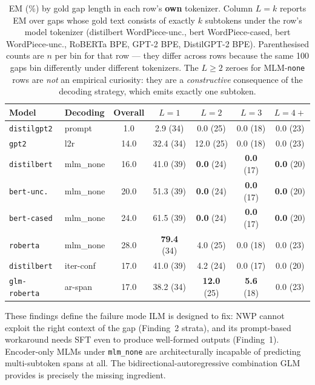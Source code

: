 \documentclass[11pt]{article}
\begin{document}
\begin{table}[t]
\centering\footnotesize
\setlength{\tabcolsep}{5pt}
\begin{tabular}{@{}llccccc@{}}
\toprule
Model & Decoding & Overall & $L{=}1$ & $L{=}2$ & $L{=}3$ & $L{=}4+$ \\
\midrule
\texttt{distilgpt2}  & prompt     &  1.0 &  2.9 (34) &  0.0 (25) & 0.0 (18) & 0.0 (23) \\
\texttt{gpt2}        & l2r        & 14.0 & 32.4 (34) & 12.0 (25) & 0.0 (18) & 0.0 (23) \\
\texttt{distilbert}  & mlm\_none       & 16.0 & 41.0 (39) &  \textbf{0.0} (24) & \textbf{0.0} (17) & \textbf{0.0} (20) \\
\texttt{bert-unc.}   & mlm\_none       & 20.0 & 51.3 (39) &  \textbf{0.0} (24) & \textbf{0.0} (17) & \textbf{0.0} (20) \\
\texttt{bert-cased}  & mlm\_none       & 24.0 & 61.5 (39) &  \textbf{0.0} (24) & \textbf{0.0} (17) & \textbf{0.0} (20) \\
\texttt{roberta}     & mlm\_none       & 28.0 & \textbf{79.4} (34) &  4.0 (25) & 0.0 (18) & 0.0 (23) \\
\texttt{distilbert}  & iter-conf  & 17.0 & 41.0 (39) &  4.2 (24) & 0.0 (17) & 0.0 (20) \\
\texttt{glm-roberta} & ar-span    & 17.0 & 38.2 (34) & \textbf{12.0} (25) & \textbf{5.6} (18) & 0.0 (23) \\
\bottomrule
\end{tabular}
\caption{EM (\%) by gold gap length in each row's \textbf{own} tokenizer.
Column $L{=}k$ reports EM over gaps whose gold text consists of exactly
$k$ subtokens under the row's model tokenizer (distilbert WordPiece-unc.,
bert WordPiece-cased, bert WordPiece-unc., RoBERTa BPE, GPT-2 BPE,
DistilGPT-2 BPE). Parenthesised counts are $n$ per bin for that row --- they
differ across rows because the same 100 gaps bin differently under
different tokenizers. The $L{\geq}2$ zeroes for MLM-\texttt{none} rows are
\emph{not} an empirical curiosity: they are a \emph{constructive}
consequence of the decoding strategy, which emits exactly one subtoken.}
\label{tab:diagnosis-own-tok}
\end{table}

These findings define the failure mode ILM is designed to fix:
NWP cannot exploit the right context of the gap (Finding~2
strata), and its prompt-based workaround needs SFT even to produce
well-formed outputs (Finding~1). Encoder-only MLMs under
\texttt{mlm\_none} are architecturally incapable of predicting
multi-subtoken spans at all. The bidirectional-autoregressive combination
GLM provides is
precisely the missing ingredient.
\end{document}
